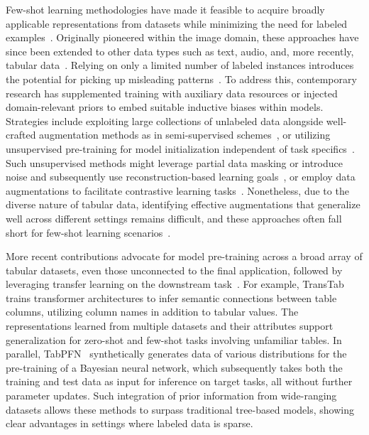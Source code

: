 Few-shot learning methodologies have made it feasible to acquire broadly applicable representations from datasets while minimizing the need for labeled examples~\cite{chen2018closer}. Originally pioneered within the image domain, these approaches have since been extended to other data types such as text, audio, and, more recently, tabular data~\cite{majumder2022few,nam2023stunt,schick2021exploiting}. Relying on only a limited number of labeled instances introduces the potential for picking up misleading patterns~\cite{bartlett2021deep}. To address this, contemporary research has supplemented training with auxiliary data resources or injected domain-relevant priors to embed suitable inductive biases within models. Strategies include exploiting large collections of unlabeled data alongside well-crafted augmentation methods as in semi-supervised schemes~\cite{ucar2021subtab,yoon2020vime}, or utilizing unsupervised pre-training for model initialization independent of task specifics~\cite{somepalli2021saint}. Such unsupervised methods might leverage partial data masking or introduce noise and subsequently use reconstruction-based learning goals~\cite{arik2021tabnet,majmundar2022met}, or employ data augmentations to facilitate contrastive learning tasks~\cite{bahri2022scarf,chen2020simple}. Nonetheless, due to the diverse nature of tabular data, identifying effective augmentations that generalize well across different settings remains difficult, and these approaches often fall short for few-shot learning scenarios~\cite{nam2023stunt}.

More recent contributions advocate for model pre-training across a broad array of tabular datasets, even those unconnected to the final application, followed by leveraging transfer learning on the downstream task~\cite{zhang2023generative,levin2022transfer,zhu2023xtab}. For example, TransTab~\cite{wang2022transtab} trains transformer architectures to infer semantic connections between table columns, utilizing column names in addition to tabular values. The representations learned from multiple datasets and their attributes support generalization for zero-shot and few-shot tasks involving unfamiliar tables. In parallel, TabPFN~\cite{hollmann2022tabpfn} synthetically generates data of various distributions for the pre-training of a Bayesian neural network, which subsequently takes both the training and test data as input for inference on target tasks, all without further parameter updates. Such integration of prior information from wide-ranging datasets allows these methods to surpass traditional tree-based models, showing clear advantages in settings where labeled data is sparse.

